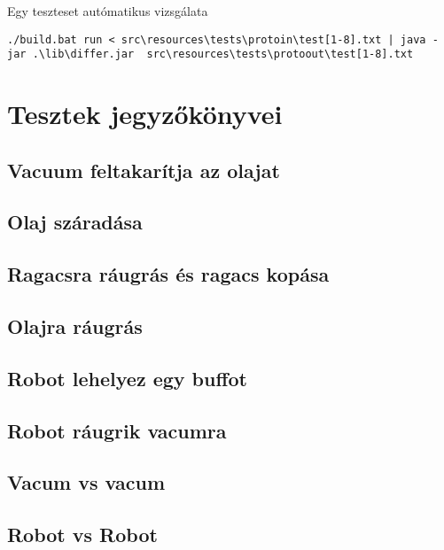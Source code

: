 Egy teszteset autómatikus vizsgálata
\lstset{escapeinside=`', xleftmargin=10pt, frame=single, basicstyle=\ttfamily\footnotesize, language=sh}
\begin{lstlisting}
./build.bat run < src\resources\tests\protoin\test[1-8].txt | java -jar .\lib\differ.jar  src\resources\tests\protoout\test[1-8].txt
\end{lstlisting}

\section{Tesztek jegyzőkönyvei}

\subsection{Vacuum feltakarítja az olajat}

\subsection{Olaj száradása}

\subsection{Ragacsra ráugrás és ragacs kopása}

\subsection{Olajra ráugrás}

\subsection{Robot lehelyez egy buffot}

\subsection{Robot ráugrik vacumra}

\subsection{Vacum vs vacum}

\subsection{Robot vs Robot}

